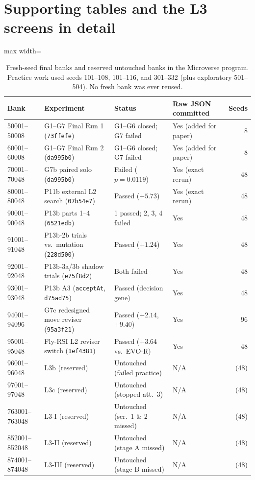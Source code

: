 
\section{Supporting tables and the L3 screens in detail}

\label{app:tables}

\begin{table}[t]
\centering
\caption{Fresh-seed final banks and reserved untouched banks in the Microverse program. Practice work used seeds 101--108, 101--116, and 301--332 (plus exploratory 501--504). No fresh bank was ever reused.}
\label{tab:seed-banks}
\small
\begin{adjustbox}{max width=\textwidth}
\begin{tabular}{@{}llllr@{}}
\toprule
\textbf{Bank} & \textbf{Experiment} & \textbf{Status} & \textbf{Raw JSON committed} & \textbf{Seeds} \\
\midrule
50001--50008 & G1--G7 Final Run 1 (\texttt{73ffefe}) & G1--G6 closed; G7 failed & Yes (added for paper) & 8 \\
60001--60008 & G1--G7 Final Run 2 (\texttt{da995b0}) & G1--G6 closed; G7 failed & Yes (added for paper) & 8 \\
70001--70048 & G7b paired solo (\texttt{da995b0}) & Failed ($p=0.0119$) & Yes (exact rerun) & 48 \\
80001--80048 & P11b external L2 search (\texttt{07b54e7}) & Passed ($+5.73$) & Yes (exact rerun) & 48 \\
90001--90048 & P13b parts 1--4 (\texttt{6521edb}) & 1 passed; 2, 3, 4 failed & Yes & 48 \\
91001--91048 & P13b-2b trials vs.\ mutation (\texttt{228d500}) & Passed ($+1.24$) & Yes & 48 \\
92001--92048 & P13b-3a/3b shadow trials (\texttt{e75f8d2}) & Both failed & Yes & 48 \\
93001--93048 & P13b A3 (\texttt{acceptAt}, \texttt{d75ad75}) & Passed (decision gene) & Yes & 48 \\
94001--94096 & G7c redesigned move reviser (\texttt{95a3f21}) & Passed ($+2.14$, $+9.40$) & Yes & 96 \\
95001--95048 & Fly-RSI L2 reviser switch (\texttt{1ef4381}) & Passed ($+3.64$ vs.\ EVO-R) & Yes & 48 \\
\midrule
96001--96048 & L3b (reserved) & Untouched (failed practice) & N/A & (48) \\
97001--97048 & L3c (reserved) & Untouched (stopped att.\ 3) & N/A & (48) \\
763001--763048 & L3-I (reserved) & Untouched (scr.\ 1 \& 2 missed) & N/A & (48) \\
852001--852048 & L3-II (reserved) & Untouched (stage A missed) & N/A & (48) \\
874001--874048 & L3-III (reserved) & Untouched (stage B missed) & N/A & (48) \\
\bottomrule
\end{tabular}
\end{adjustbox}
\end{table}

